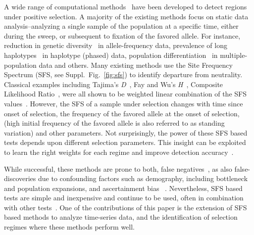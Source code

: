 A wide range of computational methods~\cite{vitti2013detecting} have
been developed to detect regions under positive selection. A majority
of the existing methods focus on static data analysis--analyzing a
single sample of the population at a specific time, either during the
sweep, or subsequent to fixation of the favored allele. For instance,
reduction in genetic
diversity~\cite{tajima1989statistical,fay2000hitchhiking,ronen2013learning}
in allele-frequency data, prevalence of long
haplotypes~\cite{sabeti2006positive,vitti2013detecting} in haplotype
(phased) data, population
differentiation~\cite{holsinger2009genetics,burke2010genome} in
multiple-population data and others. Many existing methods use the
Site Frequency Spectrum (SFS, see Suppl.~Fig.~\ref{fig:sfs}) to
identify departure from neutrality. Classical examples including
Tajima's \emph{D}~\cite{tajima1989statistical}, Fay and Wu's
\emph{H}~\cite{fay2000hitchhiking}, Composite Likelihood
Ratio~\cite{nielsen2005genomic}, were all shown to be weighted linear
combination of the SFS values~\cite{achaz2009frequency}. However, the
SFS of a sample under selection changes with time since onset of
selection, the frequency of the favored allele at the onset of
selection, (high initial frequency of the favored allele is also
referred to as standing variation) and other parameters. Not
surprisingly, the power of these SFS based tests depends upon
different selection parameters. This insight can be exploited to learn
the right weights for each regime and improve detection
accuracy~\cite{ronen2013learning}.

While successful, these methods are prone to both, false
negatives~\cite{messer2013population}, as also false-discoveries due
to confounding factors such as demography, including bottleneck and
population expansions, and ascertainment bias ~\cite{ptak2002evidence,
  ramos2002statistical,akey2009constructing,
  nielsen2003correcting,messer2013population}. Nevertheless, SFS based
tests are simple and inexpensive and continue to be used, often in
combination with other
tests~\cite{akey2009constructing,vitti2013detecting}. One of the
contributions of this paper is the extension of SFS based methods to
analyze time-series data, and the identification of selection regimes
where these methods perform well.

